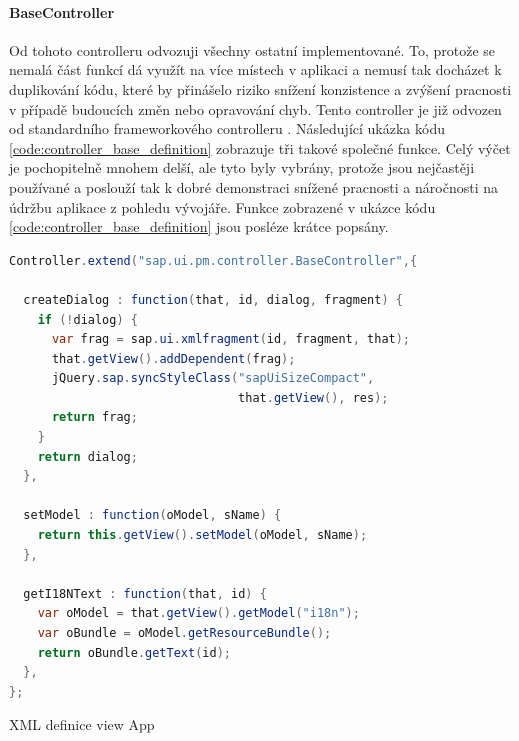 \documentclass[thesis=M,czech]{FITthesis}[2012/06/26]
\begin{document}
\paragraph{BaseController} Od tohoto controlleru odvozuji všechny ostatní implementované. To, protože se nemalá část funkcí dá využít na více místech v aplikaci a nemusí tak docházet k duplikování kódu, které by přinášelo riziko snížení konzistence a zvýšení pracnosti v případě budoucích změn nebo opravování chyb. Tento controller je již odvozen od standardního frameworkového controlleru . 
Následující ukázka kódu \ref{code:controller_base_definition} zobrazuje tři takové společné funkce. Celý výčet je pochopitelně mnohem delší, ale tyto byly vybrány, protože jsou nejčastěji používané a poslouží tak k dobré demonstraci snížené pracnosti a náročnosti na údržbu aplikace z pohledu vývojáře. Funkce zobrazené v ukázce kódu \ref{code:controller_base_definition} jsou posléze krátce popsány.
\begin{algorithm}[H]
	\begin{lstlisting}[language=java]      
Controller.extend("sap.ui.pm.controller.BaseController",{

  createDialog : function(that, id, dialog, fragment) {
    if (!dialog) {
      var frag = sap.ui.xmlfragment(id, fragment, that);
      that.getView().addDependent(frag);
      jQuery.sap.syncStyleClass("sapUiSizeCompact", 
                                that.getView(), res);
      return frag;
    }
    return dialog;
  },  
  
  setModel : function(oModel, sName) {
    return this.getView().setModel(oModel, sName);
  },

  getI18NText : function(that, id) {
    var oModel = that.getView().getModel("i18n");
    var oBundle = oModel.getResourceBundle();
    return oBundle.getText(id);
  }, 
}; 
	\end{lstlisting}
	\caption{XML definice view App}	
	\label{code:controller_base_definition}
\end{algorithm}	
\end{document}
